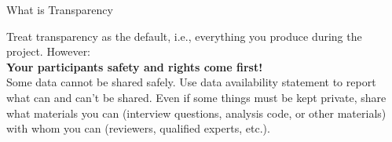\begin{block}{What is Transparency}
      
 
  

 
  
 
  
  Treat transparency as the default, i.e., everything you produce during the project. However:\\
  \textbf{Your participants safety and rights come first!} \\
  Some data cannot be shared safely. Use data availability statement to report what can and can't be shared. Even if some things must be kept private, share what materials you can (interview questions, analysis code, or other materials) with whom you can (reviewers, qualified experts, etc.). 


\end{block}
